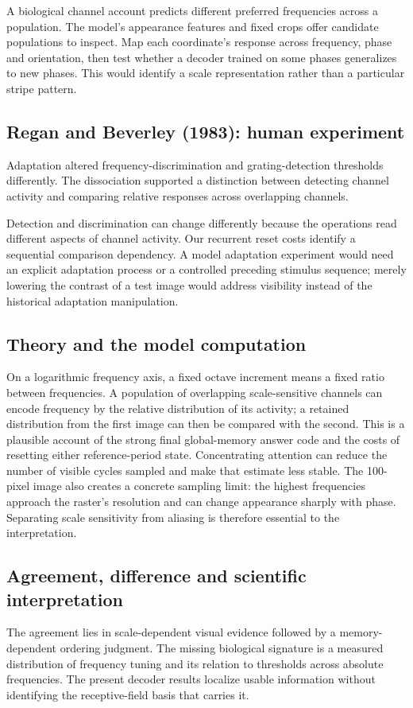 \documentclass[11pt]{article}
\begin{document}
A biological channel account predicts different preferred frequencies across a population. The model’s appearance features and fixed crops offer candidate populations to inspect. Map each coordinate’s response across frequency, phase and orientation, then test whether a decoder trained on some phases generalizes to new phases. This would identify a scale representation rather than a particular stripe pattern.

\subsection{Regan and Beverley (1983): human experiment}
Adaptation altered frequency-discrimination and grating-detection thresholds differently. The dissociation supported a distinction between detecting channel activity and comparing relative responses across overlapping channels. \cite{bio_regan}

Detection and discrimination can change differently because the operations read different aspects of channel activity. Our recurrent reset costs identify a sequential comparison dependency. A model adaptation experiment would need an explicit adaptation process or a controlled preceding stimulus sequence; merely lowering the contrast of a test image would address visibility instead of the historical adaptation manipulation.

\subsection{Theory and the model computation}
On a logarithmic frequency axis, a fixed octave increment means a fixed ratio between frequencies. A population of overlapping scale-sensitive channels can encode frequency by the relative distribution of its activity; a retained distribution from the first image can then be compared with the second. This is a plausible account of the strong final global-memory answer code and the costs of resetting either reference-period state. Concentrating attention can reduce the number of visible cycles sampled and make that estimate less stable. The 100-pixel image also creates a concrete sampling limit: the highest frequencies approach the raster’s resolution and can change appearance sharply with phase. Separating scale sensitivity from aliasing is therefore essential to the interpretation.

\subsection{Agreement, difference and scientific interpretation}
The agreement lies in scale-dependent visual evidence followed by a memory-dependent ordering judgment. The missing biological signature is a measured distribution of frequency tuning and its relation to thresholds across absolute frequencies. The present decoder results localize usable information without identifying the receptive-field basis that carries it.
\end{document}

